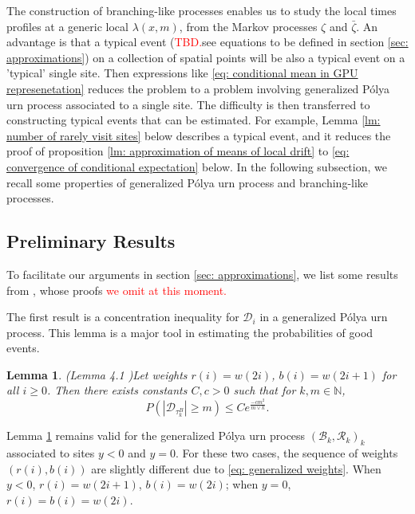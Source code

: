 \documentclass[twoside,12pt,a4paper]{article}
\newtheorem{lemma}{Lemma}[section]
\numberwithin{equation}{section}
\newcommand{\abs}[1]{\left\vert #1 \right\vert}
\newcommand\TBD{\textcolor{red}{TBD.}}
\begin{document}
	
		
		The construction of branching-like processes enables us to study the local times profiles at a generic local $\lambda(x,m)$, from the Markov processes $\zeta$ and $\bar{\zeta}$. An advantage is that a typical event (\TBD{see equations to be defined in section \ref{sec: approximations}}) on a collection of spatial points will be also a typical event on a 'typical' single site. Then expressions like \eqref{eq: conditional mean in GPU represenetation} reduces the problem to a problem involving generalized P\'{o}lya urn process associated to a single site. The difficulty is then transferred to constructing typical events that can be estimated. For example, Lemma \ref{lm: number of rarely visit sites} below describes a typical event, and it reduces the proof of proposition \ref{lm: approximation of means of local drift} to \eqref{eq: convergence of conditional expectation} below. In the following subsection, we recall some properties of generalized P\'{o}lya urn process and branching-like processes.
		
		\subsection{Preliminary Results}
		To facilitate our arguments in section \ref{sec: approximations}, we list some results from \cite{KMP22,T96}, whose proofs \textcolor{red}{we omit at this moment.}
		
		The first result is a concentration inequality for $\mathcal{D}_i$ in a generalized P\'{o}lya urn process. This lemma is a major tool in estimating the probabilities of good events.
		\begin{lemma}(Lemma 4.1 \cite{KMP22})\label{lm: concentration inequality}
			Let weights $r(i) = w(2i)$, $b(i)= w(2i+1) $ for all $i\geq 0$. Then there exists constants $C,c>0$ such that for $k, m \in \mathbb{N}$,
			$$
			P\left(  \abs{ \mathcal{D}_{\tau_k^B}   } \geq m \right) \leq C e^{\frac{-cm^2}{m \vee k}}.
			$$
		\end{lemma} 
		Lemma \ref{lm: concentration inequality} remains valid for the generalized P\'{o}lya urn process $(\mathcal{B}_{k},\mathcal{R}_{k})_k$ associated to sites $y<0$ and $y=0$. For these two cases, the sequence of weights $(r(i),b(i))$ are slightly different due to \eqref{eq: generalized weights}. When $y<0$, $r(i) = w(2i+1)$, $b(i)= w(2i) $; when $y=0$, $r(i) = b(i)=w(2i)$.
		
\end{document}
